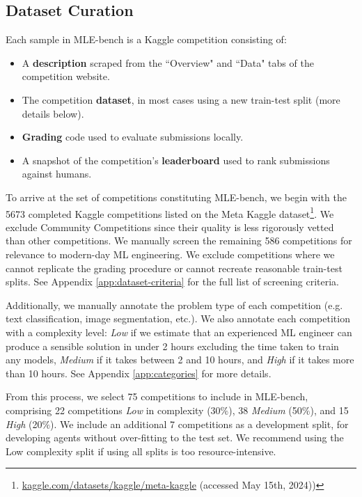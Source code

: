 \documentclass{article} %
\begin{document}
\subsection{Dataset Curation}
\label{sec:dataset-curation}

Each sample in MLE-bench is a Kaggle competition consisting of:

\begin{itemize}[itemsep=1pt, topsep=0pt]
    \item A \textbf{description} scraped from the ``Overview" and ``Data" tabs of the competition website.
    \item The competition \textbf{dataset}, in most cases using a new train-test split (more details below).
    \item \textbf{Grading} code used to evaluate submissions locally.
    \item A snapshot of the competition’s \textbf{leaderboard} used to rank submissions against humans.
\end{itemize}

To arrive at the set of competitions constituting MLE-bench, we begin with the 5673 completed Kaggle competitions listed on the Meta Kaggle dataset\footnote{\href{https://www.kaggle.com/datasets/kaggle/meta-kaggle}{kaggle.com/datasets/kaggle/meta-kaggle} (accessed May 15th, 2024))}. We exclude Community Competitions since their quality is less rigorously vetted than other competitions. We manually screen the remaining 586 competitions for relevance to modern-day ML engineering. We exclude competitions where we cannot replicate the grading procedure or cannot recreate reasonable train-test splits. See Appendix \ref{app:dataset-criteria} for the full list of screening criteria.

Additionally, we manually annotate the problem type of each competition (e.g. text classification, image segmentation, etc.). We also annotate each competition with a complexity level: \textit{Low} if we estimate that an experienced ML engineer can produce a sensible solution in under 2 hours excluding the time taken to train any models, \textit{Medium} if it takes between 2 and 10 hours, and \textit{High} if it takes more than 10 hours. See Appendix \ref{app:categories} for more details.

From this process, we select 75 competitions to include in MLE-bench, comprising 22 competitions \textit{Low} in complexity (30$\%$), 38 \textit{Medium} (50$\%$), and 15 \textit{High} (20$\%$). We include an additional 7 competitions as a development split, for developing agents without over-fitting to the test set. We recommend using the Low complexity split if using all splits is too resource-intensive.
\end{document}
